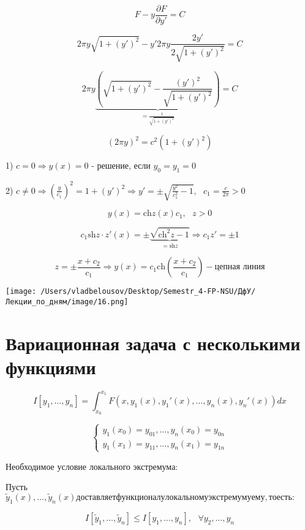 \documentclass[12pt, a4paper]{report}
\begin{document}
\[ F- y \frac{\partial  F }{\partial   y' } = C   \] 

\[ 2 \pi y \sqrt{ 1 + (y' ) ^2 } - y ' 2 \pi y \frac{2 y '}{ 2 \sqrt{1 + ( y ') ^2 }} = C  \] 

\[ 2 \pi y \underbrace{\left( \sqrt{1 + (  y') ^2 } - \frac{ (y ' ) ^2 }{\sqrt{1 + ( y ' ) ^2 }}  \right)}_{= \frac{1}{\sqrt{ 1 + ( y ' ) ^2 }} } = C \] 

\[ ( 2 \pi y  ) ^2 = c ^2 ( 1 + ( y '   ) ^2 ) \] 

1) \( c= 0 \Rightarrow y(x )  =0  \) - решение, если \( y_0 = y_1 = 0 \) 

2) \( c \neq 0 \Rightarrow \left(  \frac{y}{c_1 }     \right) ^2 = 1 + ( y ' ) ^2 \Rightarrow y ' = \pm  \sqrt{\frac{ y ^2 }{c_1 ^2} - 1  }, \text{ }  c_1 = \frac{c}{2 \pi} > 0         \) 

\[ y( x ) = \mathrm{ch}  z(x  ) c_1 , \text{ }  z> 0 \]  

\[ c_1 \mathrm{sh } z \cdot z ' (x )   =\pm \underbrace{ \sqrt{\mathrm{ch} ^2 z - 1  }}_{= \mathrm{sh} z  }   \Rightarrow c_1 z'  = \pm 1   \] 

\[ z= \pm  \frac{ x+ c_2 }{c_1} \Rightarrow y ( x )  = c_1 \mathrm{ch} \left( \frac{x+c_2 }{c_1}  \right)  - \text{цепная линия}  \] 

\begin{center}
    \texttt{[image: /Users/vladbelousov/Desktop/Semestr\_4-FP-NSU/ДфУ/Лекции\_по\_дням/image/16.png]}
\end{center}



\section{Вариационная задача с несколькими функциями}

\[ I[y_1, \ldots, y_n ] = \int_{x_0 }^{x_1 } F(x,y_1(x),y_1 ' (x), \ldots , y_n ( x ) , y _n '( x))dx  \] 

\[ \begin{cases}
    y_1(x_0 ) = y_{01} , \ldots , y_n ( x_0 ) = y_{0n } \\
    y_1(x_1 ) = y_{11} , \ldots , y_n ( x_1) = y_{1n }
\end{cases} \] 

Необходимое условие локального экстремума: 

Пусть \( \tilde{y }_1 (x ) ,\ldots, \tilde{y }_n( x )  доставляет функционалу локальному экстремуму ему, то есть: \)

\[ I [\tilde{y }_1, \ldots , \tilde{y}_n  ] \le I[y_1, \ldots , y_n ] , \text{ }  \forall y_2, \ldots , y_n \] 
\end{document}
